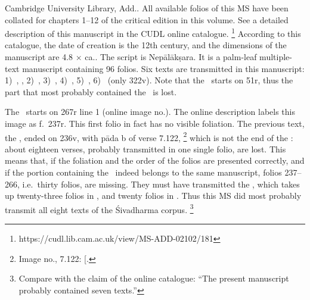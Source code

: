 Cambridge University Library, Add.. 
All available folios of this MS have been collated for 
chapters 1--12 of the critical edition in this volume. 
See a detailed description of this manuscript 
in the CUDL online catalogue.%
	\footnote{https://cudl.lib.cam.ac.uk/view/MS-ADD-02102/181}
According to this catalogue, the date of creation is the 12th
century, and the dimensions of the manuscript are 
4.8 × ca.\thinspace 52.5cm. 
The script is Nepālākṣara. It is a palm-leaf multiple-text manuscript
containing 96 folios. Six texts are transmitted in this manuscript: 
1)~, ,
2)~, 
3)~, 
4)~,
5)~,
6)~ (only \fol322v). 
Note that the \SDhU\ starts on \fol51r, thus the part that most probably contained the \SDhS\ is lost.

The \Vss\ starts on \fol267r line 1 
(online image no.). 
The online description labels this image as f.~237r. 
This first folio in fact has no visible foliation.
The previous text, the ,
ended on \fol236v, with pāda b of verse 7.122,%
 		\footnote{Image no., 
   7.122: 
  {[}\skt{prāsā}{]}.}
which is not the end of the : 
about eighteen 
verses, probably transmitted in one single folio, are lost.
This means that, if the foliation and the order of the folios
are presented correctly, and if the portion containing
the \VSS\ indeed belongs to the same manuscript, 
folios 237--266, i.e.\ thirty folios, are missing. 
They must have transmitted the 
, 
which takes up twenty-three folios in \msCa, and twenty folios in \msCb.
Thus this MS did most probably transmit all eight texts of the
Śivadharma corpus.%
	\footnote{Compare with the claim of the online catalogue:
		``The present manuscript probably contained seven texts.''}	

